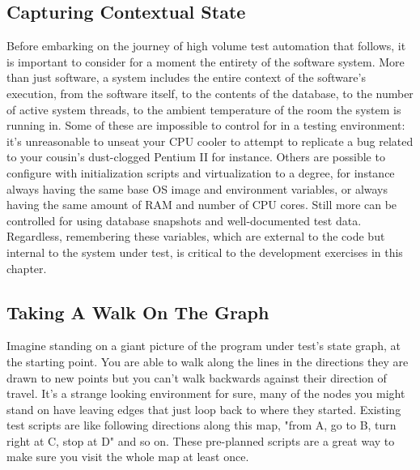 

\subsection{Capturing Contextual State}
Before embarking on the journey of high volume test automation that follows, it is important to consider for a moment the entirety of the software system. More than just software, a system includes the entire context of the software's execution, from the software itself, to the contents of the database, to the number of active system threads, to the ambient temperature of the room the system is running in. Some of these are impossible to control for in a testing environment: it's unreasonable to unseat your CPU cooler to attempt to replicate a bug related to your cousin's dust-clogged Pentium II for instance. Others are possible to configure with initialization scripts and virtualization to a degree, for instance always having the same base OS image and environment variables, or always having the same amount of RAM and number of CPU cores. Still more can be controlled for using database snapshots and well-documented test data. Regardless, remembering these variables, which are external to the code but internal to the system under test, is critical to the development exercises in this chapter.

\subsection{Taking A Walk On The Graph}
Imagine standing on a giant picture of the program under test's state graph, at the starting point. You are able to walk along the lines in the directions they are drawn to new points but you can't walk backwards against their direction of travel. It's a strange looking environment for sure, many of the nodes you might stand on have leaving edges that just loop back to where they started. Existing test scripts are like following directions along this map, "from A, go to B, turn right at C, stop at D" and so on. These pre-planned scripts are a great way to make sure you visit the whole map at least once.

